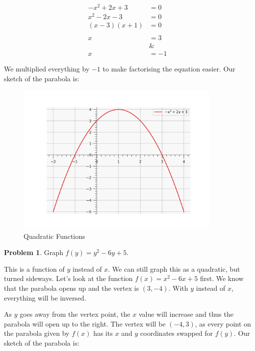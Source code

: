 \documentclass[12pt]{article}
\theoremstyle{definition}
\newtheorem{problem}{Problem}
\begin{document}
\begin{align}
    -x^2+2x+3  & = 0  \\
    x^2-2x-3   & = 0  \\
    (x-3)(x+1) & = 0  \\
    \nonumber         \\
    x          & = 3  \\
               & \&   \\
    x          & = -1
\end{align}

We multiplied everything by $-1$ to make factorising the equation easier.
Our sketch of the parabola is:

\begin{figure}[H]
    \centering
    \includegraphics[width=10cm, keepaspectratio]{graph_3.png}
    \caption{Quadratic Functions}
    \label{fig:fig3}
\end{figure}

\begin{problem}
Graph $f(y) = y^2-6y+5$.
\end{problem}

This is a function of $y$ instead of $x$.
We can still graph this as a quadratic, but turned sideways.
Let's look at the function $f(x) = x^2-6x+5$ first.
We know that the parabola opens up and the vertex is $(3, -4)$.
With $y$ instead of $x$, everything will be inversed.

As $y$ goes away from the vertex point, the $x$ value will increase and thus the parabola will open up to the right.
The vertex will be $(-4, 3)$, as every point on the parabola given by $f(x)$ has its $x$ and $y$ coordinates swapped for $f(y)$.
Our sketch of the parabola is:
\end{document}
